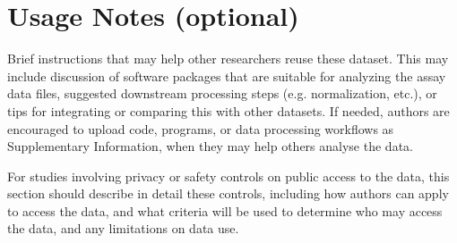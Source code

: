 \section{Usage Notes (optional)}

Brief instructions that may help other researchers reuse these dataset.  This may include discussion of software packages that are suitable for analyzing the assay data files, suggested downstream processing steps (e.g. normalization, etc.), or tips for integrating or comparing this with other datasets.  If needed, authors are encouraged to upload code, programs, or data processing workflows as Supplementary Information, when they may help others analyse the data.

For studies involving privacy or safety controls on public access to the data, this section should describe in detail these controls, including how authors can apply to access the data, and what criteria will be used to determine who may access the data, and any limitations on data use.  

